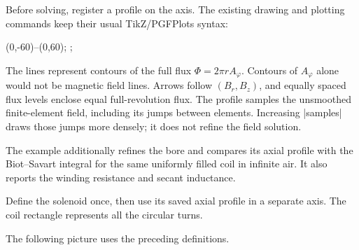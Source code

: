 Before solving, register a profile on the axis. The existing drawing
and plotting commands keep their usual TikZ/PGFPlots syntax:
\begin{codeexample}
\path[femm/profile={name=solenoid-axis,samples=121}]
  (0,-60)--(0,60);
;
\femmplot[profile=solenoid-axis,component=Bz,abscissa=z]
\end{codeexample}
The lines represent contours of the full flux $\Phi=2\pi rA_\varphi$.
Contours of $A_\varphi$ alone would not be magnetic field lines. Arrows follow
$(B_r,B_z)$, and equally spaced flux levels enclose equal full-revolution flux.
The profile samples the unsmoothed finite-element field, including its jumps
between elements. Increasing |samples| draws those jumps more densely; it does
not refine the field solution.

The example additionally refines the bore and compares its axial
profile with the Biot--Savart integral for the same uniformly filled coil in
infinite air. It also reports the winding resistance and secant inductance.

Define the solenoid once, then use its saved axial profile in a separate axis. The coil rectangle represents all the circular turns.


\begin{codeexample}
\end{codeexample}

The following picture uses the preceding definitions.


\begin{codeexample}[width=0pt]
\end{codeexample}

